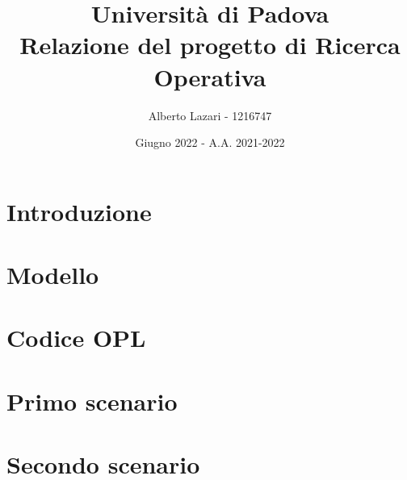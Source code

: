 \documentclass[12pt]{article}
\title{\textbf{Università di Padova \\ Relazione del progetto di Ricerca Operativa}}
\author{Alberto Lazari - 1216747}
\date{Giugno 2022 - A.A. 2021-2022}
\begin{document}
	\maketitle
	\pagebreak

	\tableofcontents
	\pagebreak

	\section{Introduzione}
	
	\pagebreak

	\section{Modello}
	
	\pagebreak

	\section{Codice OPL}
	

	\section{Primo scenario}
	

	\section{Secondo scenario}
	
\end{document}
